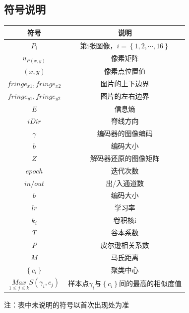 \documentclass{whutmod}
\begin{document}
\begin{itemize}
	\section{符号说明}
		\begin{table}[H]
		\centering
		\setlength{\tabcolsep}{12mm}
		\begin{tabular}{cc}
			\toprule[1.5pt]
			\multicolumn{1}{m{5cm}}{\centering 符号} & \multicolumn{1}{m{5cm}}{\centering 说明} \\
			\midrule[1pt]		
$P_{i}$  & 第i张图像，$i=\left\{1, 2, \cdots, 16\right\}$  \\ 
$u_{P(x,y)}$& 像素矩阵 \\
$(x,y)$  & 像素点位置值  \\ 
$fringe_{x1}, fringe_{x2}$  & 图片的上下边界  \\ 
$fringe_{y1}, fringe_{y2}$  & 图片的左右边界  \\ 
$E$  & 信息熵  \\ 
$iDir$  &  脊线方向 \\ 
$\gamma$  & 编码器的图像编码  \\ 
$b$  & 编码大小  \\ 
$Z$  & 解码器还原的图像矩阵  \\ 
$epoch$  & 迭代次数  \\ 
$in/out$  & 出/入通道数  \\ 
  	$b$  & 编码大小  \\ 
$lr$  & 学习率  \\ 
$k_i$  & 卷积核i  \\ 
$T$  & 谷本系数  \\ 
$P$  & 皮尔逊相关系数  \\ 
$M$  &  马氏距离 \\ 
$\left \{ c_i \right \}$  &  聚类中心 \\ 
$\underset{1\leqslant j\leqslant k}{Max}S(\gamma _i,c_j)$&样本点$ \gamma_i $与$\left \{ c_i \right \}$间的最高的相似度值\\
			\bottomrule[1.5pt]
		\end{tabular}
		\end{table}

\end{itemize}
\end{document}
